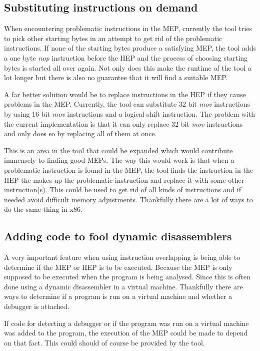 \documentclass[11pt,twoside]{eitExjobb}
\begin{document}
\subsection{Substituting instructions on demand}
When encountering problematic instructions in the MEP, currently the tool tries to pick other starting bytes in an attempt to get rid of the problematic instructions. If none of the starting bytes produce a satisfying MEP, the tool adds a one byte \emph{nop} instruction before the HEP and the process of choosing starting bytes is started all over again. Not only does this make the runtime of the tool a lot longer but there is also no guarantee that it will find a suitable MEP.

A far better solution would be to replace instructions in the HEP if they cause problems in the MEP. Currently, the tool can substitute 32 bit \emph{mov} instructions by using 16 bit \emph{mov} instructions and a logical shift instruction. The problem with the current implementation is that it can only replace 32 bit \emph{mov} instructions and only does so by replacing all of them at once.

This is an area in the tool that could be expanded which would contribute immensely to finding good MEPs. The way this would work is that when a problematic instruction is found in the MEP, the tool finds the instruction in the HEP the makes up the problematic instruction and replace it with some other instruction(s). This could be used to get rid of all kinds of instructions and if needed avoid difficult memory adjustments. Thankfully there are a lot of ways to do the same thing in x86. 

\subsection{Adding code to fool dynamic disassemblers}
A very important feature when using instruction overlapping is being able to determine if the MEP or HEP is to be executed. Because the MEP is only supposed to be executed when the program is being analysed. Since this is often done using a dynamic disassembler in a virtual machine. Thankfully there are ways to determine if a program is run on a virtual machine and whether a debugger is attached.

If code for detecting a debugger or if the program was run on a virtual machine was added to the program, the execution of the MEP could be made to depend on that fact. This could should of course be provided by the tool.
\end{document}
